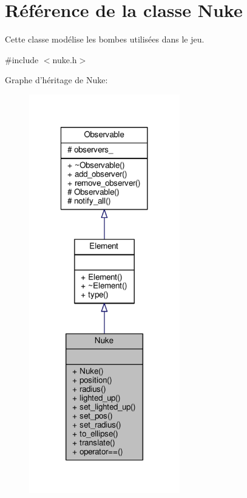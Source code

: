 \hypertarget{classNuke}{\section{Référence de la classe Nuke}
\label{classNuke}
}


Cette classe modélise les bombes utilisées dans le jeu.  




{\ttfamily \#include $<$nuke.\+h$>$}



Graphe d'héritage de Nuke\+:
\nopagebreak
\begin{figure}[H]
\begin{center}
\leavevmode
\includegraphics[width=186pt]{d7/d17/classNuke__inherit__graph}
\end{center}
\end{figure}


